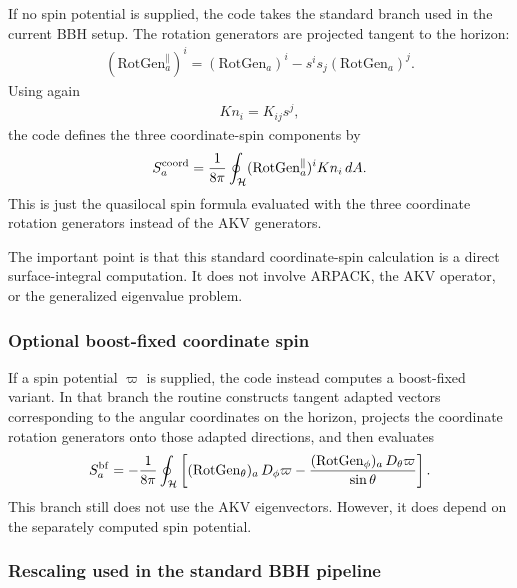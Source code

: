 If no spin potential is supplied, the code takes the standard branch used in the current BBH setup.  The rotation generators are projected tangent to the horizon:
\begin{align}
(\mathrm{RotGen}_a^\parallel)^i
  = (\mathrm{RotGen}_a)^i - s^i s_j (\mathrm{RotGen}_a)^j.
\end{align}
Using again
\begin{align}
Kn_i = K_{ij}s^j,
\end{align}
the code defines the three coordinate-spin components by
\begin{align}
S^{\rm coord}_a
  = \frac{1}{8\pi}\oint_{\mathcal H}
      (\mathrm{RotGen}_a^\parallel)^i Kn_i\, dA.
\label{eq:spec-coordspin}
\end{align}
This is just the quasilocal spin formula evaluated with the three coordinate rotation generators instead of the AKV generators.

The important point is that this standard coordinate-spin calculation is a direct surface-integral computation.  It does not involve ARPACK, the AKV operator, or the generalized eigenvalue problem.

\subsubsection{Optional boost-fixed coordinate spin}

If a spin potential $\varpi$ is supplied, the code instead computes a boost-fixed variant.  In that branch the routine constructs tangent adapted vectors corresponding to the angular coordinates on the horizon, projects the coordinate rotation generators onto those adapted directions, and then evaluates
\begin{align}
S^{\rm bf}_a
  = -\frac{1}{8\pi}\oint_{\mathcal H}
     \left[
       (\mathrm{RotGen}_\theta)_a\, D_\phi \varpi
       - \frac{(\mathrm{RotGen}_\phi)_a\, D_\theta \varpi}{\sin\theta}
     \right].
\label{eq:spec-boost-fixed}
\end{align}
This branch still does not use the AKV eigenvectors.  However, it does depend on the separately computed spin potential.

\subsubsection{Rescaling used in the standard BBH pipeline}

